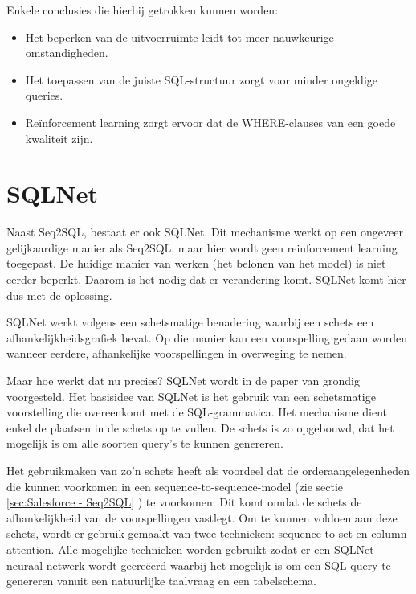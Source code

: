 Enkele conclusies die hierbij getrokken kunnen worden:
\begin{itemize}
	\item Het beperken van de uitvoerruimte leidt tot meer nauwkeurige omstandigheden.
	\item Het toepassen van de juiste SQL-structuur zorgt voor minder ongeldige queries.
	\item Reïnforcement learning zorgt ervoor dat de WHERE-clauses van een goede kwaliteit zijn.
\end{itemize}

\section{SQLNet}

Naast Seq2SQL, bestaat er ook SQLNet. Dit mechanisme werkt op een ongeveer gelijkaardige manier als Seq2SQL, maar hier wordt geen reinforcement learning toegepast. De huidige manier van werken (het belonen van het model) is niet eerder beperkt. Daarom is het nodig dat er verandering komt. SQLNet komt hier dus met de oplossing.

SQLNet werkt volgens een schetsmatige benadering waarbij een schets een afhankelijkheidsgrafiek bevat. Op die manier kan een voorspelling gedaan worden wanneer eerdere, afhankelijke voorspellingen in overweging te nemen. 

Maar hoe werkt dat nu precies? SQLNet wordt in de paper van \textcite{sqlnetPaper} grondig voorgesteld. Het basisidee van SQLNet is het gebruik van een schetsmatige voorstelling die overeenkomt met de SQL-grammatica. Het mechanisme dient enkel de plaatsen in de schets op te vullen. De schets is zo opgebouwd, dat het mogelijk is om alle soorten query’s te kunnen genereren.

Het gebruikmaken van zo’n schets heeft als voordeel dat de orderaangelegenheden die kunnen voorkomen in een sequence-to-sequence-model (zie  sectie \ref{sec:Salesforce - Seq2SQL} ) te voorkomen. Dit komt omdat de schets de afhankelijkheid van de voorspellingen vastlegt. Om te kunnen voldoen aan deze schets, wordt er gebruik gemaakt van twee technieken: sequence-to-set en column attention. Alle mogelijke technieken worden gebruikt zodat er een SQLNet neuraal netwerk wordt gecreëerd waarbij het mogelijk is om een SQL-query te genereren vanuit een natuurlijke taalvraag en een tabelschema.

